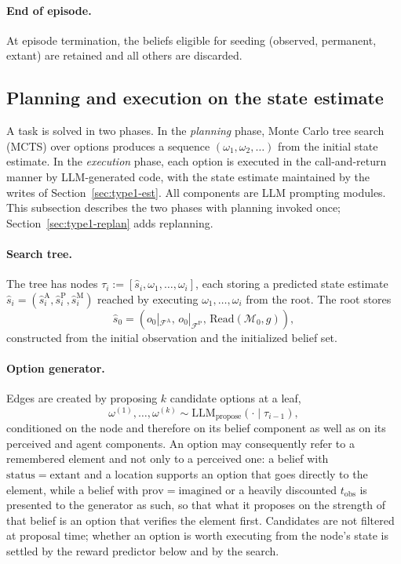 \documentclass[11pt]{article}
\newcommand{\llm}[1]{\mathrm{LLM}_{\mathrm{#1}}}
\newcommand{\calF}{\mathcal{F}}
\newcommand{\calM}{\mathcal{M}}
\newcommand{\shat}{\hat{s}}
\newcommand{\FA}{\calF^{\mathrm{A}}}
\newcommand{\FP}{\calF^{\mathrm{P}}}
\newcommand{\Read}{\mathrm{Read}}
\newcommand{\prov}{\mathrm{prov}}
\newcommand{\stat}{\mathrm{status}}
\newcommand{\tobs}{t_{\mathrm{obs}}}
\begin{document}
\paragraph{End of episode.}
At episode termination, the beliefs eligible for seeding (observed, permanent, extant) are retained and all others are discarded. 

\subsection{Planning and execution on the state estimate}
\label{sec:type1-plan}

A task is solved in two phases. In the \emph{planning} phase, Monte Carlo tree search (MCTS) over options produces a sequence $(\omega_1,\omega_2,\dots)$ from the initial state estimate. In the \emph{execution} phase, each option is executed in the call-and-return manner by LLM-generated code, with the state estimate maintained by the writes of Section~\ref{sec:type1-est}. All components are LLM prompting modules. This subsection describes the two phases with planning invoked once; Section~\ref{sec:type1-replan} adds replanning.

\paragraph{Search tree.}
The tree has nodes $\tau_i:=[\shat_i,\omega_1,\dots,\omega_i]$, each storing a predicted state estimate $\shat_i=(\hat s^{\mathrm{A}}_i,\hat s^{\mathrm{P}}_i,\hat s^{\mathrm{M}}_i)$ reached by executing $\omega_1,\dots,\omega_i$ from the root. The root stores
\begin{equation}
\shat_0=(o_0|_{\FA},\,o_0|_{\FP},\,\Read(\calM_0,g)),
\label{eq:root}
\end{equation}
constructed from the initial observation and the initialized belief set.

\paragraph{Option generator.}
Edges are created by proposing $k$ candidate options at a leaf,
\begin{equation}
\omega^{(1)},\dots,\omega^{(k)}\sim \llm{propose}(\cdot\mid\tau_{i-1}),
\label{eq:generator}
\end{equation}
conditioned on the node and therefore on its belief component as well as on its perceived and agent components. An option may consequently refer to a remembered element and not only to a perceived one: a belief with $\stat=\mathrm{extant}$ and a location supports an option that goes directly to the element, while a belief with $\prov=\mathrm{imagined}$ or a heavily discounted $\tobs$ is presented to the generator as such, so that what it proposes on the strength of that belief is an option that verifies the element first. Candidates are not filtered at proposal time; whether an option is worth executing from the node's state is settled by the reward predictor below and by the search.
\end{document}
